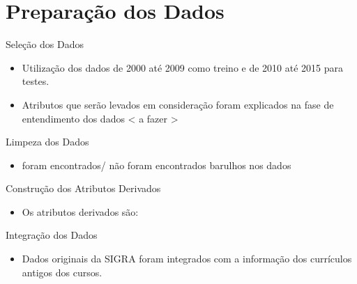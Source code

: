 \section{Preparação dos Dados}
\begin{frame}{Seleção dos Dados}
\begin{itemize}[itemsep=3ex]
    \item Utilização dos dados de 2000 até 2009 como treino e de 2010 até 2015 para
        testes. 
    \item Atributos que serão levados em consideração foram explicados na fase de
        entendimento dos dados < a fazer >
\end{itemize}
\end{frame}

\begin{frame}{Limpeza dos Dados}
\begin{itemize}[itemsep=3ex]
    \item <a fazer> foram encontrados/ não foram encontrados barulhos nos dados
\end{itemize}
\end{frame}

\begin{frame}{Construção dos Atributos Derivados}
\begin{itemize}[itemsep=3ex]
    \item Os atributos derivados são: 
\end{itemize}
\end{frame}

\begin{frame}{Integração dos Dados}
\begin{itemize}[itemsep=3ex]
    \item Dados originais da SIGRA foram integrados com a informação dos currículos
        antigos dos cursos.
\end{itemize}
\end{frame}


